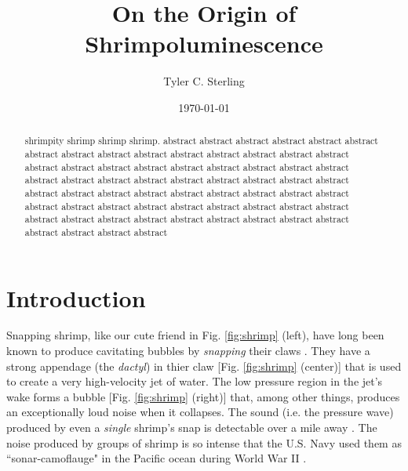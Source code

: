\documentclass[rmp,aps,nofootinbib,superscriptaddress,floatfix]{revtex4-2}
\begin{document}
\title{On the Origin of Shrimpoluminescence}

\author{Tyler C. Sterling}

\date{\today}

\begin{abstract}
shrimpity shrimp shrimp shrimp. abstract abstract abstract abstract abstract abstract abstract abstract abstract abstract abstract abstract abstract abstract abstract abstract abstract abstract abstract abstract abstract abstract abstract abstract abstract abstract abstract abstract abstract abstract abstract abstract abstract abstract abstract abstract abstract abstract abstract abstract abstract abstract abstract abstract abstract abstract abstract abstract abstract abstract abstract abstract abstract abstract abstract abstract abstract abstract abstract abstract abstract abstract abstract abstract 
\end{abstract}

\maketitle





\section{Introduction}
Snapping shrimp, like our cute friend in Fig. \ref{fig:shrimp} (left), have long been known to produce cavitating bubbles by \emph{snapping} their claws \cite{versluis2000snapping,lohse2001snapping,tang2019bioinspired}. They have a strong appendage (the \emph{dactyl}) in thier claw [Fig. \ref{fig:shrimp} (center)] that is used to create a very high-velocity jet of water. The low pressure region in the jet's wake forms a bubble [Fig. \ref{fig:shrimp} (right)] that, among other things, produces an exceptionally loud noise when it collapses. The sound (i.e. the pressure wave) produced by even a \emph{single} shrimp's snap is detectable over a mile away \cite{everest1948acoustical}. The noise produced by groups of shrimp is so intense that the U.S. Navy used them as ``sonar-camoflauge" in the Pacific ocean during World War II \cite{versluis2000snapping}. 
\end{document}
